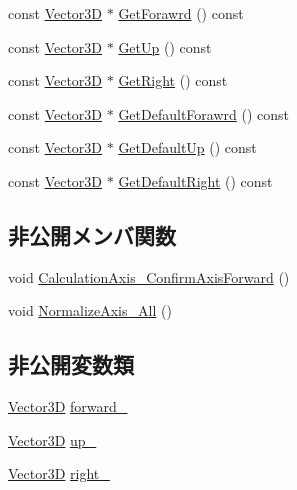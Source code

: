 \begin{DoxyCompactItemize}
\item 
const \mbox{\hyperlink{class_vector3_d}{Vector3D}} $\ast$ \mbox{\hyperlink{class_axis_vector_a79013d5b090ce9232d57f528f18e982e}{Get\+Forawrd}} () const
\item 
const \mbox{\hyperlink{class_vector3_d}{Vector3D}} $\ast$ \mbox{\hyperlink{class_axis_vector_aba45ae6f91ac516e6e42fdb8bcfcae2e}{Get\+Up}} () const
\item 
const \mbox{\hyperlink{class_vector3_d}{Vector3D}} $\ast$ \mbox{\hyperlink{class_axis_vector_a1d4f944d118d6f999c516dbdc0827a39}{Get\+Right}} () const
\item 
const \mbox{\hyperlink{class_vector3_d}{Vector3D}} $\ast$ \mbox{\hyperlink{class_axis_vector_a83ead17514eb08954dc74c0e72b6158c}{Get\+Default\+Forawrd}} () const
\item 
const \mbox{\hyperlink{class_vector3_d}{Vector3D}} $\ast$ \mbox{\hyperlink{class_axis_vector_a32f68ef0864e7b589d3c1996a61e11fc}{Get\+Default\+Up}} () const
\item 
const \mbox{\hyperlink{class_vector3_d}{Vector3D}} $\ast$ \mbox{\hyperlink{class_axis_vector_aacf0879e0b9ace6cfbd29c8a300cd960}{Get\+Default\+Right}} () const
\end{DoxyCompactItemize}
\subsection*{非公開メンバ関数}
\begin{DoxyCompactItemize}
\item 
void \mbox{\hyperlink{class_axis_vector_a1b7758fdc7a7ef1809a7a5de1777ee65}{Calculation\+Axis\+\_\+\+Confirm\+Axis\+Forward}} ()
\item 
void \mbox{\hyperlink{class_axis_vector_abd3b0ec608bc18dc9996cf9fa1d121b0}{Normalize\+Axis\+\_\+\+All}} ()
\end{DoxyCompactItemize}
\subsection*{非公開変数類}
\begin{DoxyCompactItemize}
\item 
\mbox{\hyperlink{class_vector3_d}{Vector3D}} \mbox{\hyperlink{class_axis_vector_aec3d9026c069398bc320bc978c060b67}{forward\+\_\+}}
\item 
\mbox{\hyperlink{class_vector3_d}{Vector3D}} \mbox{\hyperlink{class_axis_vector_ab73c08b8dbf399af48b01b4a17bd5d33}{up\+\_\+}}
\item 
\mbox{\hyperlink{class_vector3_d}{Vector3D}} \mbox{\hyperlink{class_axis_vector_af3e806442baa272fe79a08a38c8a6669}{right\+\_\+}}
\end{DoxyCompactItemize}
